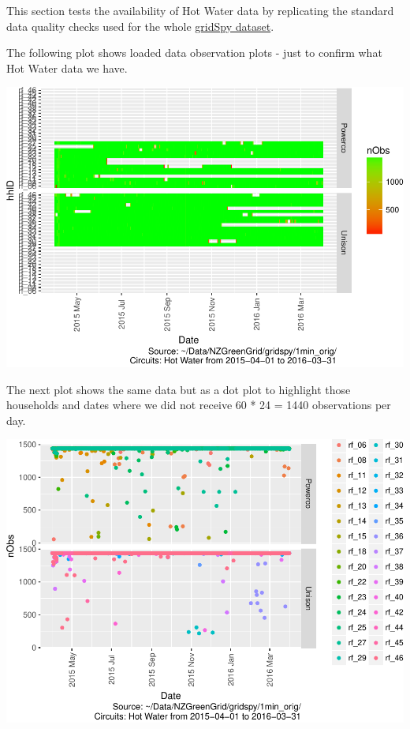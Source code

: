 \documentclass[]{article}
\begin{document}
This section tests the availability of Hot Water data by replicating the
standard data quality checks used for the whole
\href{https://git.soton.ac.uk/ba1e12/nzGREENGrid/tree/master/dataProcessing/gridSpy}{gridSpy
dataset}.

The following plot shows loaded data observation plots - just to confirm
what Hot Water data we have.

\includegraphics{ggHotWaterProfiles_files/figure-latex/loadedFilesObs Tile Plot-1.pdf}

The next plot shows the same data but as a dot plot to highlight those
households and dates where we did not receive 60 * 24 = 1440
observations per day.

\includegraphics{ggHotWaterProfiles_files/figure-latex/loadedFilesObs point plot-1.pdf}
\end{document}
